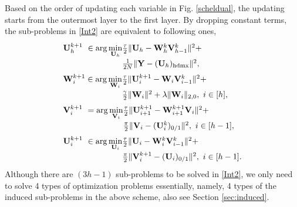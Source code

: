 \documentclass[journal]{IEEEtran}
\newcommand{\ba}{\begin{array}}
\newcommand{\ea}{\end{array}}
\def\U{{\bf U}}
\def\V{{\bf V}}
\def\W{{\bf W}}
\def\Y{{\bf Y}}
\def\hd{{\rm hdmx}}
\begin{document}
\indent Based on the order of updating each variable in Fig. \ref{scheldual}, the updating starts from the outermost layer to the first layer. By dropping constant terms, the sub-problems in \eqref{Int2} are equivalent to following ones,
\begin{align}
& \label{Int3-Uh}
\arraycolsep=0pt\def\arraystretch{1.25}
\ba{lcll}
\U_{h}^{k+1}~\in\operatorname{arg} \min\limits_{\U_h}  &&\frac{\tau}{2} \|\U_h-\W_{h}^{k}\V_{h-1}^{k}\|^2+\\
&&\frac{1}{2N} \|\Y- (\U_h)_{\hd}\|^{2} ,\ea \\
& \label{Int3-Wi}
\arraycolsep=0pt\def\arraystretch{1.25}
\ba{lcll}
\W_{i}^{k+1}\in\operatorname{arg} \min\limits_{\W_i}  &&\frac{\tau}{2} \|\U_{i}^{k+1}-\W_{i}\V_{i-1}^k\|^2+\\
&&\frac{\gamma }{2}\|\W_{i}\|^2+ \lambda \|\W_{i}\|_{2,0},~ i\in[h], \ea \\
& \label{Int3-Vi}
\arraycolsep=0pt\def\arraystretch{1.25}
\ba{lcll}
\V_{i}^{k+1}~=\operatorname{arg} \min\limits_{\V_{i}}  &&\frac{\tau}{2}\|\U_{i+1}^{k+1}-\W_{i+1}^{k+1}\V_{i}\|^2+\\
&&\frac{\pi}{2}\|\V_{i}-(\U_{i}^{k})_{0/1}\|^2,~ i\in[h-1],  \ea \\
& \label{Int3-Ui}
\arraycolsep=0pt\def\arraystretch{1.25}
\ba{lcll} \U_{i}^{k+1}~\in\operatorname{arg} \min\limits_{\U_{i}}
&&\frac{\tau}{2}\|\U_{i}-\W_{i}^{k}\V_{i-1}^{k}\|^2+\\
&& \frac{\pi}{2}\|\V_{i}^{k+1}-(\U_{i})_{0/1}\|^2,~ i\in[h-1]. \ea
\end{align}
Although there are $(3h-1)$ sub-problems to be solved in \eqref{Int2}, we only need to solve 4 types of optimization problems essentially, namely,  4 types of the induced sub-problems in the above scheme, also see Section \ref{sec:induced}.
\end{document}
